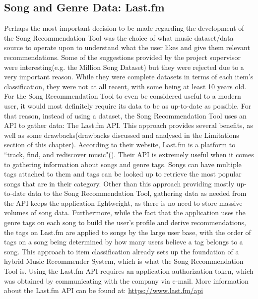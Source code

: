 \documentclass{l4proj}
\begin{document}
\subsection{Song and Genre Data: Last.fm}
Perhaps the most important decision to be made regarding the development of the Song Recommendation Tool was the choice of what music dataset/data source to operate upon to understand what the user likes and give them relevant recommendations. Some of the suggestions provided by the project supervisor were interesting(e.g. the Million Song Dataset) but they were rejected due to a very important reason. While they were complete datasets in terms of each item's classification, they were not at all recent, with some being at least 10 years old. For the Song Recommendation Tool to even be considered useful to a modern user, it would most definitely require its data to be as up-to-date as possible. For that reason, instead of using a dataset, the Song Recommendation Tool uses an API to gather data: The Last.fm API. This approach provides several benefits, as well as some drawbacks(drawbacks discussed and analysed in the Limitations section of this chapter). According to their website, Last.fm is a platform to ``track, find, and rediscover music"(\cite{Last.fm}). Their API is extremely useful when it comes to gathering information about songs and genre tags. Songs can have multiple tags attached to them and tags can be looked up to retrieve the most popular songs that are in their category. Other than this approach providing mostly up-to-date data to the Song Recommendation Tool, gathering data as needed from the API keeps the application lightweight, as there is no need to store massive volumes of song data. Furthermore, while the fact that the application uses the genre tags on each song to build the user's profile and derive recommendations, the tags on Last.fm are applied to songs by the large user base, with the order of tags on a song being determined by how many users believe a tag belongs to a song. This approach to item classification already sets up the foundation of a hybrid Music Recommender System, which is what the Song Recommendation Tool is. Using the Last.fm API requires an application authorization token, which was obtained by communicating with the company via e-mail. More information about the Last.fm API can be found at: \url{https://www.last.fm/api}
\end{document}
